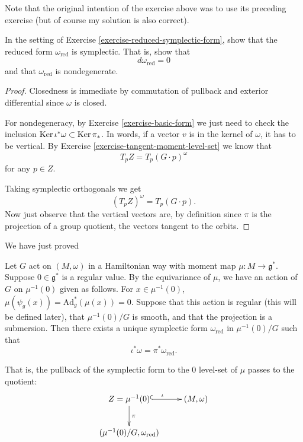 \noindent
Note that the original intention of the
exercise above was to use its
preceding exercise (but of course
my solution is also correct).

\begin{exercise}
\label{exercise-reduced-form-is-symplectic}
In the setting of Exercise
\ref{exercise-reduced-symplectic-form},
show that the reduced form
$\omega_{\mathrm{red}}$ is symplectic.
That is, show that
$$
d\omega_{\mathrm{red}}=0
$$
and that $\omega_{\mathrm{red}}$ is
nondegenerate.
\end{exercise}

\begin{proof}
Closedness is immediate
by commutation of pullback and
exterior differential since $\omega$
is closed.

For nondegeneracy,
by Exercise \ref{exercise-basic-form}
we just need to check the inclusion
$\mathop{\mathrm{Ker}} \iota^*\omega \subset \mathop{\mathrm{Ker}} \pi_*$.
In words, if a vector $v$ is in the
kernel of $\omega$, it has to be vertical.
By Exercise
\ref{exercise-tangent-moment-level-set}
we know that
$$
T_pZ = T_p(G\cdot p)^\omega
$$
for any $p \in Z$.

Taking symplectic orthogonals
we get
$$
(T_pZ)^\omega=T_p(G\cdot p).
$$
Now just observe that the vertical
vectors are, by definition 
since $\pi$ is the projection of
a group quotient, the vectors
tangent to the orbits.
\end{proof}

\noindent
We have just proved

\begin{theorem}
\label{theorem-marsden-weinstein-megre}
Let $G$ act on $(M,\omega)$ in a Hamiltonian
way
with moment map $\mu:M \to \mathfrak{g}^*$.
Suppose $0 \in \mathfrak{g}^*$ is a regular
value.
By the equivariance of $\mu$, we have an
action of $G$ on $\mu^{-1}(0)$
given as follows. For $x \in \mu^{-1}(0)$,
$\mu(\psi_g(x))=\text{Ad}_g^*(\mu(x))=0$.
Suppose that this action is regular (this
will be defined later),
that $\mu^{-1}(0)/G$ is smooth, and that the
projection is a submersion.
Then there exists a unique symplectic form
$\omega_{\text{red}}$ in $\mu^{-1}(0)/G$
such that
$$
\iota^*\omega=\pi^*\omega_{\text{red}}.
$$
\end{theorem}

\noindent
That is, the pullback of the symplectic form
to the
0 level-set of $\mu$ passes to the quotient:
$$
\xymatrix{
Z=\mu^{-1}(0)\ar[d]^{\pi}\ar@{^{(}->}[r]
^{\iota}&
(M,\omega)\\
(\mu^{-1}(0)/G,\omega_{\text{red}})
}
$$

